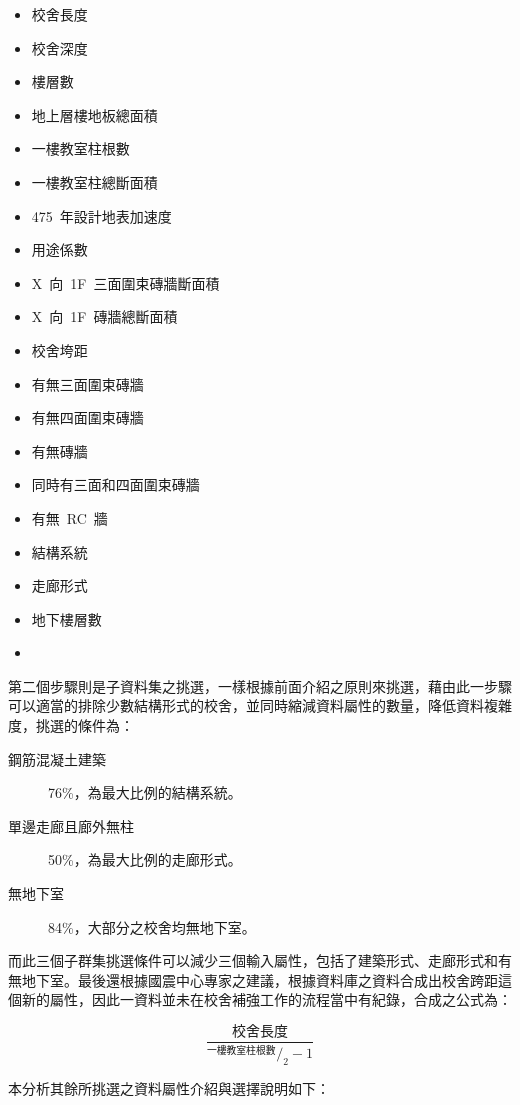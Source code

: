 \begin{multicols}{2}
\begin{itemize}
\item 校舍長度
\item 校舍深度
\item 樓層數
\item 地上層樓地板總面積
\item 一樓教室柱根數
\item 一樓教室柱總斷面積
\item 475~年設計地表加速度
\item 用途係數
\item X~向~1F~三面圍束磚牆斷面積
\item X~向~1F~磚牆總斷面積
\item 校舍垮距
\item 有無三面圍束磚牆
\item 有無四面圍束磚牆
\item 有無磚牆
\item 同時有三面和四面圍束磚牆
\item 有無~RC~牆
\item 結構系統
\item 走廊形式
\item 地下樓層數
\item[]
\end{itemize}
\end{multicols}

第二個步驟則是子資料集之挑選，一樣根據前面介紹之原則來挑選，藉由此一步驟可以適當的排除少數結構形式的校舍，並同時縮減資料屬性的數量，降低資料複雜度，挑選的條件為：

\begin{description}
\item [鋼筋混凝土建築] 76\%，為最大比例的結構系統。
\item [單邊走廊且廊外無柱] 50\%，為最大比例的走廊形式。
\item [無地下室] 84\%，大部分之校舍均無地下室。
\end{description}

而此三個子群集挑選條件可以減少三個輸入屬性，包括了建築形式、走廊形式和有無地下室。最後還根據國震中心專家之建議，根據資料庫之資料合成出校舍跨距這個新的屬性，因此一資料並未在校舍補強工作的流程當中有紀錄，合成之公式為：

\begin{equation} \dfrac{\text{校舍長度}}{^{\text{一樓教室柱根數}}/_2 - 1} \label{eq:span}\end{equation} 

本分析其餘所挑選之資料屬性介紹與選擇說明如下：

